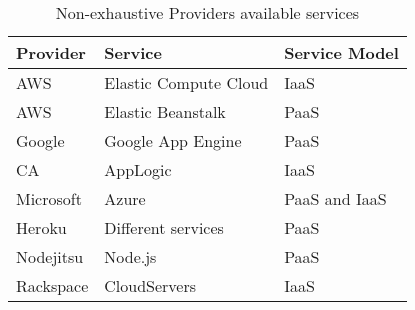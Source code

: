 \begin{table}
  \begin{tabular}{ | l | l | l | }
    \hline
    \textbf{Provider} & \textbf{Service} & \textbf{Service Model} \\ \hline
    AWS & Elastic Compute Cloud & IaaS \\ \hline
    AWS & Elastic Beanstalk & PaaS \\ \hline
    Google & Google App Engine & PaaS \\ \hline
    CA & AppLogic & IaaS \\ \hline
    Microsoft & Azure & PaaS and IaaS \\ \hline
    Heroku & Different services & PaaS \\ \hline
    Nodejitsu & Node.js & PaaS \\ \hline
    Rackspace & CloudServers & IaaS \\ \hline
  \end{tabular}
  \caption{Non-exhaustive Providers available services}
  \label{table:providerservices}
\end{table}


